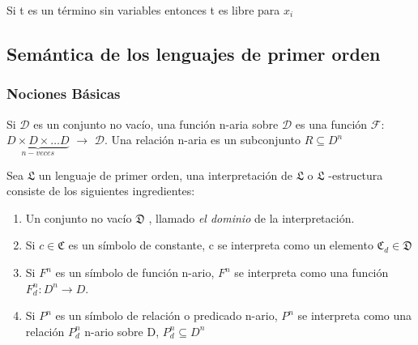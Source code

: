 \begin{example}
Si t es un t\'ermino sin variables entonces t es libre para $x_i$
\end{example}

\subsection{Sem\'antica de los lenguajes de primer orden}

\subsubsection{Nociones B\'asicas}

Si $\mathcal{D}$ es un conjunto no vac\'io, una funci\'on n-aria sobre $\mathcal{D}$ es una funci\'on $\mathcal{F}$: $\underbrace{D \times D \times \ldots D}_{n-veces}$ $\rightarrow$ $\mathcal{D}$. Una relaci\'on n-aria es un subconjunto $R \subseteq D^n$

\begin{definition}

Sea $\mathfrak{L}$  un lenguaje de primer orden, una interpretaci\'on de $\mathfrak{L}$  o $\mathfrak{L}$ -estructura consiste de los siguientes ingredientes:

\begin{enumerate}
	\item Un conjunto no vac\'io $\mathfrak{D}$ , llamado \textit{el dominio} de la interpretaci\'on.
	\item Si $c \in \mathfrak{C}$ es un s\'imbolo de constante, c se interpreta como un elemento $\mathfrak{C}_d \in \mathfrak{D}$
	\item Si $F^n$ es un s\'imbolo de funci\'on n-ario, $F^n$ se interpreta como una funci\'on $F^{n}_{d} : D^n \to D$.
	\item Si $P^n$ es un s\'imbolo de relaci\'on o predicado n-ario, $P^n$ se interpreta como una relaci\'on $P^{n}_{d}$ n-ario sobre D, $P^{n}_{d} \subseteq D^n$
\end{enumerate}

\end{definition}

